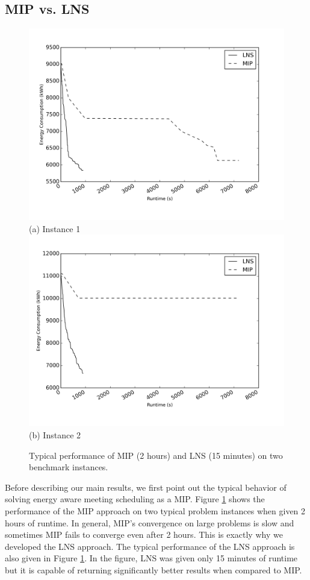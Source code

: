 \subsection{MIP vs. LNS}

\begin{figure}
	\centering
		\includegraphics[width=0.9\linewidth]{figs/eams_meeting_m200_2.png} \\
(a) Instance 1  \\[6pt]
		\includegraphics[width=0.9\linewidth]{figs/eams_meeting_m200_1.png}\\
(b) Instance 2  \\[6pt]
	\caption{Typical performance of MIP (2 hours) and LNS (15 minutes) on two benchmark instances.}
	\label{fig:compare}
\end{figure}

Before describing our main results, we first point out the typical behavior of solving energy aware meeting scheduling as a MIP. Figure \ref{fig:compare} shows the performance of the MIP approach on two typical problem instances when given 2 hours of runtime. In general, MIP's convergence on large problems is slow and sometimes MIP fails to converge even after 2 hours. This is exactly why we developed the LNS approach. The typical performance of the LNS approach is also given in Figure \ref{fig:compare}. In the figure, LNS was given only 15 minutes of runtime but it is capable of returning significantly better results when compared to MIP.



